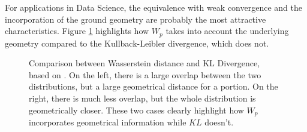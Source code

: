 For applications in Data Science, the equivalence with weak convergence and the
incorporation of the ground geometry are probably the most attractive characteristics.
Figure \ref{fig:wl-kl}
highlights how $W_p$ takes into account the underlying geometry compared
to the Kullback-Leibler divergence, which does not.


\begin{figure}[H]
  \centering
  \def\svgscale{0.7}
  
	\caption{Comparison between Wasserstein distance and KL Divergence, based on \citet{montavon2016boltzmann}.
  On the left,
  there is a large overlap between the two distributions, but a large geometrical distance for a portion. On the right,
  there is much less overlap, but the whole distribution is geometrically closer. These two
  cases clearly highlight how $W_p$ incorporates geometrical information while $KL$ doesn't.}
	\label{fig:wl-kl}
\end{figure}